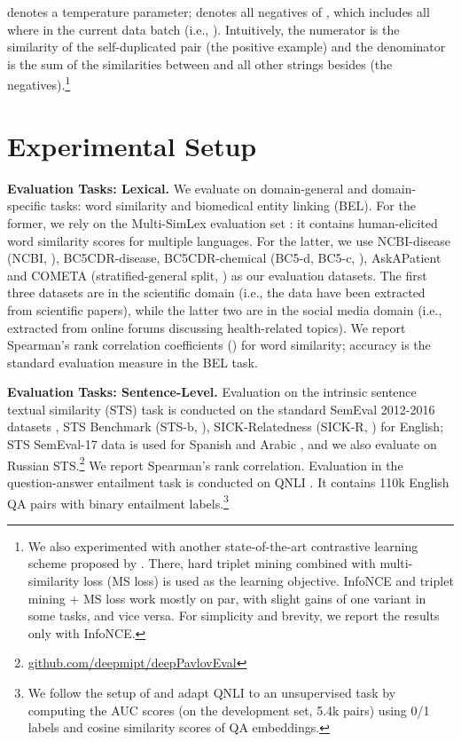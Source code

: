 \documentclass[11pt]{article}
\begin{document}
\vspace{-2mm}
{\footnotesize
} denotes a temperature parameter;  denotes all negatives of , which includes all  where  in the current data batch (i.e., ). Intuitively, the numerator is the similarity of the self-duplicated pair (the positive example) and the denominator is the sum of the similarities between  and all other strings besides  (the negatives).\footnote{We also experimented with another state-of-the-art contrastive learning scheme proposed by \citet{liu2020self}. There, hard triplet mining combined with multi-similarity loss (MS loss) is used as the learning objective. InfoNCE and triplet mining + MS loss work mostly on par, with slight gains of one variant in some tasks, and vice versa. For simplicity and brevity, we report the results only with InfoNCE.}


\section{Experimental Setup}
\label{sec:exp}



\noindent \textbf{Evaluation Tasks: Lexical.}
We evaluate on domain-general and domain-specific tasks: word similarity and biomedical entity linking (BEL). For the former, we rely on the Multi-SimLex evaluation set \citep{vulic2020multi}: it contains human-elicited word similarity scores for multiple languages. For the latter, we use NCBI-disease (NCBI, \citealt{dougan2014ncbi}), BC5CDR-disease, BC5CDR-chemical (BC5-d, BC5-c, \citealt{li2016biocreative}), AskAPatient \citep{limsopatham2016normalising} and COMETA (stratified-general split, \citealt{cometa}) as our evaluation datasets. The first three datasets are in the scientific domain (i.e., the data have been extracted from scientific papers), while the latter two are in the social media domain (i.e., extracted from online forums discussing health-related topics). We report Spearman's rank correlation coefficients () for word similarity; accuracy  is the standard evaluation measure in the BEL task.

\vspace{1.5mm}
\noindent \textbf{Evaluation Tasks: Sentence-Level.}
Evaluation on the intrinsic sentence textual similarity (STS) task is conducted on the standard SemEval 2012-2016 datasets \citep{agirre2012semeval,agirre2013sem,agirre2014semeval,agirre2015semeval,agirre2016semeval}, STS Benchmark (STS-b, \citealt{cer2017semeval}), SICK-Relatedness (SICK-R, \citealt{marelli2014sick}) for English; STS SemEval-17 data is used for Spanish and Arabic \cite{cer2017semeval}, and we also evaluate on Russian STS.\footnote{\url{github.com/deepmipt/deepPavlovEval}} We report Spearman's  rank correlation. Evaluation in the question-answer entailment task is conducted on QNLI \citep{rajpurkar2016squad,wang2018glue}. It contains 110k English QA pairs with binary entailment labels.\footnote{We follow the setup of \citet{li-etal-2020-sentence} and adapt QNLI to an unsupervised task by computing the AUC scores (on the development set, 5.4k pairs) using 0/1 labels and cosine similarity scores of QA embeddings.}
\end{document}
